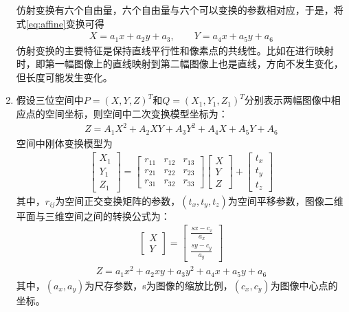 \begin{enumerate}
仿射变换有六个自由量，六个自由量与六个可以变换的参数相对应，于是，将式\ref{eq:affine}变换可得
\begin{align}
X = a_1x + a_2y + a_3, 
\qquad
Y = a_4x + a_5y + a_6
\end{align}
仿射变换的主要特征是保持直线平行性和像素点的共线性。比如在进行映射时，即第一幅图像上的直线映射到第二幅图像上也是直线，方向不发生变化，但长度可能发生变化。
\item 假设三位空间中$P=(X, Y, Z)^T$和$Q=(X_1,Y_1,Z_1)^T$分别表示两幅图像中相应点的空间坐标，则空间中二次变换模型坐标为：
\begin{align}
Z = A_1X^2 + A_2XY + A_3Y^2 + A_4X + A_5Y + A_6
\label{eq:twice-4}
\end{align}
空间中刚体变换模型为
\begin{align}
\left[ \begin{array}{c}
X_1\\
Y_1\\
Z_1
\end{array} \right]
=
\left[ \begin{array}{ccc}
r_{11} & r_{12} & r_{13} \\
r_{21} & r_{22} & r_{23} \\
r_{31} & r_{32} & r_{33}
\end{array} \right]
\left[ \begin{array}{c}
X \\
Y \\
Z
\end{array} \right]
+
\left[ \begin{array}{c}
t_x \\
t_y \\
t_z
\end{array} \right]
\label{eq:twice-1}
\end{align}
其中，$r_{ij}$为空间正交变换矩阵的参数，$(t_x, t_y, t_z)$为空间平移参数，图像二维平面与三维空间之间的转换公式为：
\begin{align}
\left[ \begin{array}{c}
X \\
Y 
\end{array} \right]
=
\left[ \begin{array}{c}
\frac{sx-c_x}{a_x} \\
\frac{sy-c_y}{a_y}
\end{array} \right]
\label{eq:twice-2}
\end{align}
\begin{align}
Z = a_1x^2 + a_2xy + a_3y^2 + a_4x + a_5y + a_6
\label{eq:twice-3}
\end{align}
其中，$(a_x, a_y)$为尺存参数，s为图像的缩放比例，$(c_x, c_y)$为图像中心点的坐标。


\end{enumerate}
